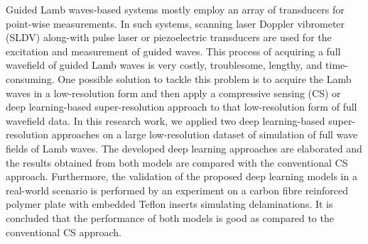 Guided Lamb waves-based systems mostly employ an array of transducers for 
point-wise measurements.
In such systems, scanning laser Doppler vibrometer (SLDV) along-with pulse 
laser or piezoelectric transducers are used for the excitation and measurement 
of guided waves. 
This process of acquiring a full wavefield of guided Lamb waves is very costly, 
troublesome, lengthy, and time-consuming.
One possible solution to tackle this problem is to acquire the Lamb waves in a 
low-resolution form and then apply a compressive sensing (CS) or deep 
learning-based super-resolution approach to that low-resolution form of full 
wavefield data.
In this research work, we applied two deep learning-based super-resolution 
approaches on a large low-resolution dataset of simulation of full wave fields 
of Lamb waves.
The developed deep learning approaches are elaborated and the results obtained 
from both models are compared with the conventional CS approach. 
Furthermore, the validation of the proposed deep learning models in a 
real-world scenario is performed by an experiment on a carbon fibre reinforced 
polymer plate with embedded Teflon inserts simulating delaminations. 
It is concluded that the performance of both models is good as compared to the 
conventional CS approach. 

